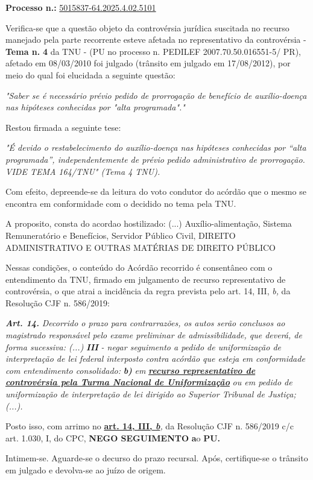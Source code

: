 \documentclass[12pt]{article}
\begin{document}
\justifying
\noindent \textbf{Processo n.: }\uline{5015837-64.2025.4.02.5101}

\noindent Verifica-se que a questão objeto da controvérsia jurídica suscitada no recurso manejado pela parte recorrente esteve afetada no representativo da controvérsia - \textbf{Tema n. }\textbf{4} da TNU - (PU no processo n. PEDILEF 2007.70.50.016551-5/ PR),  afetado em 08/03/2010 foi julgado (trânsito em julgado em 17/08/2012), por meio do qual foi elucidada a seguinte questão:

{\leftskip=3.1cm\rightskip=0.8cm\parindent=0pt \textit{"Saber se é necessário prévio pedido de prorrogação de benefício de auxílio-doença nas hipóteses conhecidas por "alta programada"."}\par}

\noindent Restou firmada a seguinte tese:

{\leftskip=3.1cm\rightskip=0.8cm\parindent=0pt \textit{"É devido o restabelecimento do auxílio-doença nas hipóteses conhecidas por “alta programada”, independentemente de prévio pedido administrativo de prorrogação. VIDE TEMA 164/TNU" (Tema 4 TNU).}\par}

\noindent Com efeito, depreende-se da leitura do voto condutor do acórdão que o mesmo se encontra em conformidade com o decidido no  tema pela TNU.

\noindent A proposito, consta do acordao hostilizado: (...) Auxílio-alimentação, Sistema Remuneratório e Benefícios, Servidor Público Civil, DIREITO ADMINISTRATIVO E OUTRAS MATÉRIAS DE DIREITO PÚBLICO

\noindent Nessas condições, o conteúdo do Acórdão recorrido é consentâneo com o entendimento da TNU, firmado em julgamento de recurso representativo de controvérsia, o que atrai a incidência da regra prevista pelo art. 14, III, \textit{b,} da Resolução CJF n. 586/2019:

\noindent \textit{\textbf{Art. 14.}}\textit{ Decorrido o prazo para contrarrazões, os autos serão conclusos ao magistrado responsável pelo exame preliminar de admissibilidade, que deverá, de forma sucessiva: (...) }\textit{\textbf{III }}\textit{- negar seguimento a pedido de uniformização de interpretação de lei federal interposto contra acórdão que esteja em conformidade com entendimento consolidado: }\textit{\textbf{b)}}\textit{ em }\textit{\textbf{\uline{recurso representativo de controvérsia pela Turma Nacional de Uniformização}}}\textit{ ou em pedido de uniformização de interpretação de lei dirigido ao Superior Tribunal de Justiça;(...).}

\noindent Posto isso, com arrimo no \textbf{\uline{art. 14, III, }}\textit{\textbf{\uline{b}}}\textit{,} da Resolução CJF n. 586/2019 c/c art. 1.030, I, do CPC, \textbf{NEGO SEGUIMENTO }\textbf{a}o\textbf{ PU}\textbf{.}

\noindent Intimem-se. Aguarde-se o decurso do prazo recursal. Após, certifique-se o trânsito em julgado e devolva-se ao juízo de origem.
\end{document}
